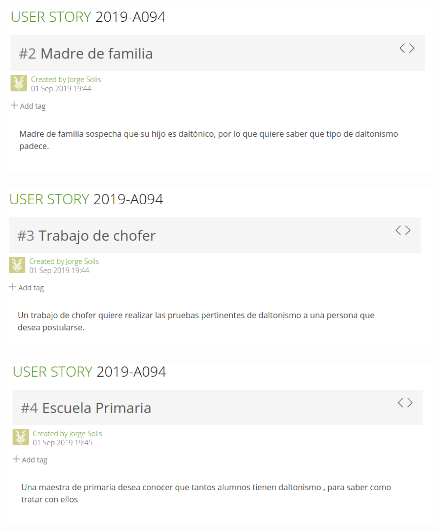\documentclass[10pt]{article}
\begin{document}
\begin{figure}[H]
	\begin{center}
\includegraphics[scale = 0.55]{HS/US2.png}
	\end{center} 
\end{figure}

\begin{figure}[H]
	\begin{center}
\includegraphics[scale = 0.55]{HS/US3.png}
	\end{center} 
\end{figure}

\begin{figure}[H]
	\begin{center}
\includegraphics[scale = 0.55]{HS/US4.png}
	\end{center} 
\end{figure}
\end{document}
